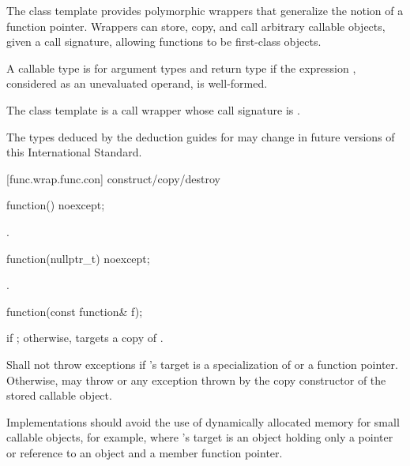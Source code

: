 \pnum
The  class template provides polymorphic wrappers that
generalize the notion of a function pointer. Wrappers can store, copy,
and call arbitrary callable objects, given a call
signature, allowing functions to be first-class objects.

\pnum
{}%
A callable type 
is  for argument
types 
and return type 
if the expression
,
considered as an unevaluated operand, is
well-formed.

\pnum
The  class template is a call
wrapper whose call signature
is .

\pnum
\begin{note}
The types deduced by the deduction guides for 
may change in future versions of this International Standard.
\end{note}

[func.wrap.func.con]{ construct/copy/destroy}

%
\begin{itemdecl}
function() noexcept;
\end{itemdecl}

\begin{itemdescr}
\pnum\postconditions {}.
\end{itemdescr}

%
\begin{itemdecl}
function(nullptr_t) noexcept;
\end{itemdecl}

\begin{itemdescr}
\pnum
\postconditions {}.
\end{itemdescr}

%
\begin{itemdecl}
function(const function& f);
\end{itemdecl}

\begin{itemdescr}
\pnum
\postconditions {} if ; otherwise,
 targets a copy of .

\pnum
\throws Shall not throw exceptions if 's target is
a specialization of  or
a function pointer. Otherwise, may throw 
or any exception thrown by the copy constructor of the stored callable object.
\begin{note} Implementations should avoid the use of
dynamically allocated memory for small callable objects, for example, where
's target is an object holding only a pointer or reference
to an object and a member function pointer. \end{note}
\end{itemdescr}

